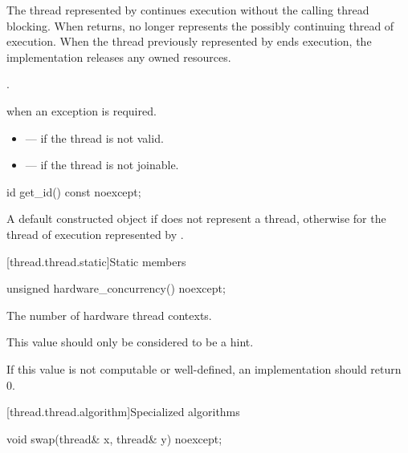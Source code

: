\begin{itemdescr}
\pnum
\effects
The thread represented by  continues execution without the calling thread
blocking. When  returns,  no longer represents the possibly continuing
thread of execution. When the thread previously represented by  ends execution, the
implementation releases any owned resources.

\pnum
\ensures
{}.

\pnum
\throws
{} when
an exception is required.

\pnum
\errors
\begin{itemize}
\item {} --- if the thread is not valid.
\item {} --- if the thread is not joinable.
\end{itemize}
\end{itemdescr}

%
\begin{itemdecl}
id get_id() const noexcept;
\end{itemdecl}

\begin{itemdescr}
\pnum
\returns
A default constructed  object if  does not represent a thread,
otherwise  for the thread of execution represented by
.
\end{itemdescr}

[thread.thread.static]{Static members}

%
\begin{itemdecl}
unsigned hardware_concurrency() noexcept;
\end{itemdecl}

\begin{itemdescr}
\pnum
\returns
The number of hardware thread contexts.
\begin{note}
This value should
only be considered to be a hint.
\end{note}
If this value is not computable or
well-defined, an implementation should return 0.
\end{itemdescr}

[thread.thread.algorithm]{Specialized algorithms}

%
\begin{itemdecl}
void swap(thread& x, thread& y) noexcept;
\end{itemdecl}

